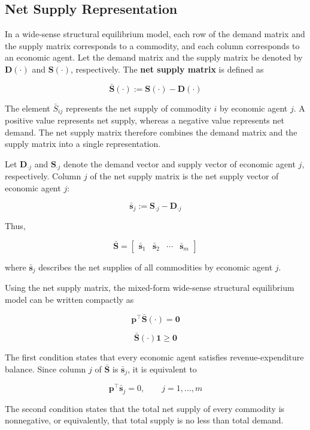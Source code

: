 \documentclass[
  letterpaper,
  DIV=11,
  numbers=noendperiod]{scrreprt}
\begin{document}
\subsection{Net Supply Representation}\label{net-supply-representation}

In a wide-sense structural equilibrium model, each row of the demand
matrix and the supply matrix corresponds to a commodity, and each column
corresponds to an economic agent. Let the demand matrix and the supply
matrix be denoted by \(\mathbf D(\cdot)\) and \(\mathbf S(\cdot)\),
respectively. The \textbf{net supply matrix} is defined as

\[
\bar{\mathbf S}(\cdot)
:=
\mathbf S(\cdot)-\mathbf D(\cdot)
\]

The element \(\bar S_{ij}\) represents the net supply of commodity \(i\)
by economic agent \(j\). A positive value represents net supply, whereas
a negative value represents net demand. The net supply matrix therefore
combines the demand matrix and the supply matrix into a single
representation.

Let \(\mathbf D_{\cdot j}\) and \(\mathbf S_{\cdot j}\) denote the
demand vector and supply vector of economic agent \(j\), respectively.
Column \(j\) of the net supply matrix is the net supply vector of
economic agent \(j\):

\[
\bar{\mathbf s}_j
:=
\mathbf S_{\cdot j}-\mathbf D_{\cdot j}
\]

Thus,

\[
\bar{\mathbf S}
=
\begin{bmatrix}
\bar{\mathbf s}_1 &
\bar{\mathbf s}_2 &
\cdots &
\bar{\mathbf s}_m
\end{bmatrix}
\]

where \(\bar{\mathbf s}_j\) describes the net supplies of all
commodities by economic agent \(j\).

Using the net supply matrix, the mixed-form wide-sense structural
equilibrium model can be written compactly as

\[
\mathbf p^\top\bar{\mathbf S}(\cdot)=\mathbf 0
\]

\[
\bar{\mathbf S}(\cdot)\mathbf 1\geq\mathbf 0
\]

The first condition states that every economic agent satisfies
revenue-expenditure balance. Since column \(j\) of \(\bar{\mathbf S}\)
is \(\bar{\mathbf s}_j\), it is equivalent to

\[
\mathbf p^\top\bar{\mathbf s}_j=0,
\qquad
j=1,\ldots,m
\]

The second condition states that the total net supply of every commodity
is nonnegative, or equivalently, that total supply is no less than total
demand.
\end{document}
